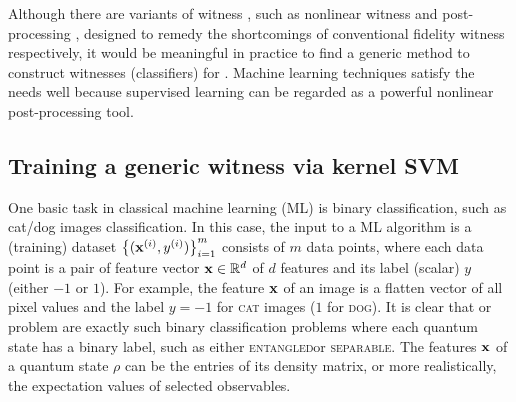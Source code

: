 \documentclass[
aps,
pra,
twocolumn,
floatfix,
]{revtex4-2}
\theoremstyle{plain}
\theoremstyle{definition}
\newcommand{\dm}{\rho}
\newcommand{\entangled}{\textsc{entangled}}
\newcommand{\separable}{\textsc{separable}}
\begin{document}
Although there are variants of witness \cite{zhouEntanglementDetectionCoherent2020}, such as nonlinear witness \cite{guhneNonlinearEntanglementWitnesses2006} and post-processing \cite{zhanDetectingEntanglementUnfaithful2021}, designed to remedy the shortcomings of conventional fidelity witness respectively, 
it would be meaningful in practice to find a generic method to construct witnesses (classifiers) for .
Machine learning techniques satisfy the needs well because supervised learning can be regarded as a powerful nonlinear post-processing tool.


\subsection{Training a generic witness via kernel SVM}
One basic task in classical machine learning (ML) is binary classification,
such as cat/dog images classification. 
In this case, the input to a ML algorithm is a (training) dataset $\qty{(\vb{x}^{(i)},y^{(i)})}_{i=1}^m$ consists of $m$ data points, 
where each data point is a pair of feature vector $\vb{x}\in \mathbb{R}^d$ of $d$ features and its label (scalar) $y$ (either $-1$ or $1$).
For example, the feature $\vb{x}$ of an image is a flatten vector of all pixel values and the label $y=-1$ for \textsc{cat} images ($1$ for \textsc{dog}).
It is clear that  or  problem are exactly such binary classification problems where each quantum state has a binary label, such as either \entangled or \separable.
The features $\vb{x}$ of a quantum state $\dm$ can be the entries of its density matrix, or more realistically, the expectation values of selected observables.
\end{document}
